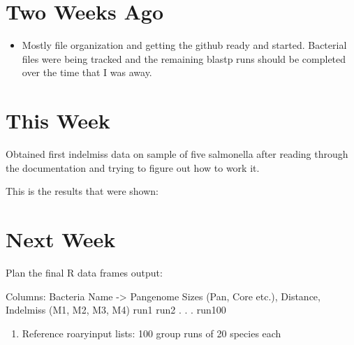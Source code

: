 \documentclass[12pt]{article}
\begin{document}
\bigskip	
	
\section*{Two Weeks Ago}

\begin{itemize} 

\item Mostly file organization and getting the github ready and started. Bacterial 
files were being tracked and the remaining blastp runs should be completed over the
time that I was away. 

\end{itemize}

\section*{This Week}
Obtained first indelmiss data on sample of five salmonella after reading through the 
documentation and trying to figure out how to work it.

This is the results that were shown:



\section*{Next Week}
Plan the final R data frames output:



Columns: Bacteria Name -> Pangenome Sizes (Pan, Core etc.), Distance, Indelmiss (M1, M2, M3, M4)
run1
run2
.
.
.
run100

\begin{enumerate}

\item Reference roaryinput lists: 100 group runs of 20 species each 

\end{enumerate}
\end{document}
